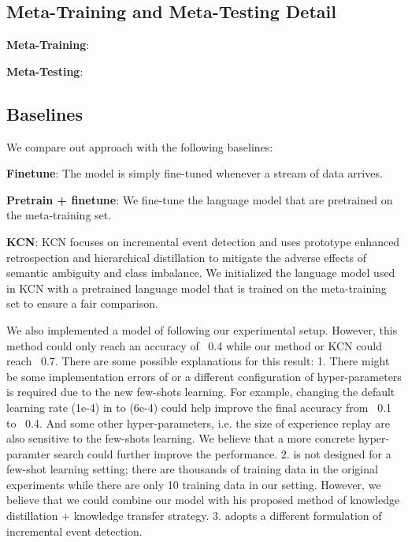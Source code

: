 \subsection{Meta-Training and Meta-Testing Detail}
\textbf{Meta-Training}: 

\textbf{Meta-Testing}: 

\subsection{Baselines}
We compare out approach with the following baselines: 

\noindent
\textbf{Finetune}: The model is simply fine-tuned whenever a stream of data arrives.

\noindent
\textbf{Pretrain + finetune}: We fine-tune the language model that are pretrained on the meta-training set. 

\noindent
\textbf{KCN}\citep{cao2020incremental}: KCN focuses on incremental event detection and uses prototype enhanced retrospection and hierarchical distillation to mitigate the adverse effects of semantic ambiguity and class imbalance. We initialized the language model used in KCN with a pretrained language model that is trained on the meta-training set to ensure a fair comparison. 

We also implemented a model of  \cite{yu2021lifelong} following our experimental setup. However, this method could only reach an accuracy of ~0.4 while our method or KCN could reach ~0.7. There are some possible explanations for this result: 1. There might be some implementation errors of  \cite{yu2021lifelong} or a different configuration of hyper-parameters is required due to the new few-shots learning. For example, changing the default learning rate (1e-4)  in  \cite{yu2021lifelong}  to (6e-4) could help improve the final accuracy from ~0.1 to ~0.4. And some other hyper-parameters, i.e. the size of experience replay are also sensitive to the few-shots learning. We believe that a more concrete hyper-paramter search could further improve the performance. 2.  \cite{yu2021lifelong}  is not designed for a few-shot learning setting; there are thousands of  training data in the original experiments while there are only 10 training data in our setting. However, we believe that we could combine our model with his proposed method of knowledge distillation + knowledge transfer strategy. 3.  \cite{yu2021lifelong} adopts a different formulation of incremental event detection.

